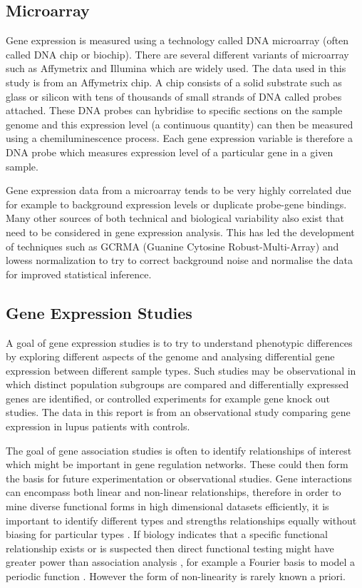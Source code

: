 \documentclass[a4paper, 12pt]{report}
\begin{document}
\subsection*{Microarray}
Gene expression is measured using a technology called DNA microarray (often called DNA chip or biochip). There are several different variants of microarray such as Affymetrix and Illumina which are widely used. The data used in this study is from an Affymetrix chip.  A chip consists of a solid substrate such as glass or silicon with tens of thousands of small strands of DNA called probes attached. These DNA probes can hybridise to specific sections on the sample genome and this expression level (a continuous quantity) can then be measured using a chemiluminescence process. Each gene expression variable is therefore a DNA probe which measures expression level of a particular gene in a given sample.

 Gene expression data from a microarray tends to be very highly correlated due for example to background expression levels or duplicate probe-gene bindings. Many other sources of both technical and biological variability also exist that need to be considered in gene expression analysis. This has led the development of techniques such as GCRMA (Guanine Cytosine Robust-Multi-Array) \cite{GCRMA} and lowess normalization \cite{microarray} to try to correct background noise and normalise the data for improved statistical inference.

\subsection*{Gene Expression Studies}
A goal of gene expression studies is to try to understand phenotypic differences by exploring different aspects of the genome and analysing differential gene expression between different sample types. Such studies may be observational in which distinct population subgroups are compared and differentially expressed genes are identified, or controlled experiments for example gene knock out studies. The data in this report is from an observational study comparing gene expression in lupus patients with controls.

The goal of gene association studies is often to identify relationships of interest which might be important in gene regulation networks. These could then form the basis for future experimentation or observational studies. Gene interactions can encompass both linear and non-linear relationships, therefore in order to mine diverse functional forms in high dimensional datasets efficiently, it is important to identify different types and strengths relationships equally without biasing for particular types \cite{BayesianGRN}. If biology indicates that a specific functional relationship exists or is suspected then direct functional testing might have greater power than association analysis \cite{bigdata2012}, for example a Fourier basis to model a periodic function \cite{BayesianGRN}. However the form of non-linearity is rarely known a priori. 
\end{document}
